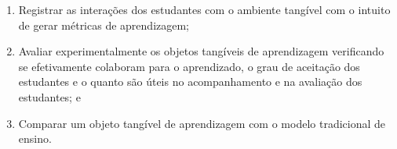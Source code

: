 

\begin{enumerate}
	\item Registrar as interações dos estudantes com o ambiente tangível com o intuito de gerar métricas de aprendizagem;
	\item  Avaliar experimentalmente os objetos tangíveis de aprendizagem verificando se efetivamente colaboram para o aprendizado, o grau de aceitação dos estudantes e o quanto são úteis no acompanhamento e na avaliação dos estudantes; e
	\item Comparar um objeto tangível de aprendizagem com o modelo tradicional de ensino.
\end{enumerate}

